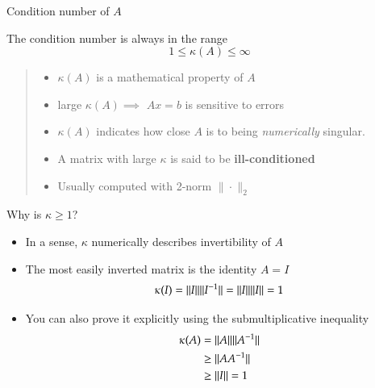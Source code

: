 \documentclass[10pt]{beamer}
\begin{document}
\begin{frame}{Condition number of $A$}

The condition number is always in the range
\begin{equation*}
    1 \le \kappa(A) \le \infty
\end{equation*}
\begin{quote}
\begin{itemize}
    \item   $\kappa(A)$ is a mathematical property of $A$
    \item   large $\kappa(A) \implies$ $Ax=b$ is sensitive to errors 
    \item   $\kappa(A)$ indicates how close
            $A$ is to being \emph{numerically} singular.
    \item   A matrix with large $\kappa$ is said to be \textbf{ill-conditioned}
    \item Usually computed with 2-norm $\|\cdot\|_2$
\end{itemize}
\end{quote}
\end{frame}
\begin{frame}{Why is $\kappa\ge 1$?}
\begin{itemize}
    \item In a sense, $\kappa$ numerically describes invertibility of $A$ 
    \item The most easily inverted matrix is the identity $A = I$
    $$
        \kappa(I) = {{\|I\|}}{{\|I^{-1}\|}} ={{\|I\|}}{{\|I\|}} =  1
    $$
    \item You can also prove it explicitly using the submultiplicative inequality 
    \begin{align*}
        \kappa(A) &=  {{\|A\|}}{{\|A^{-1}\|}}\\
                  &\ge  {\ensuremath{{\|AA^{-1}\|}}}\\
                  &\ge  {\ensuremath{{\|I\|}}}=  1 \\
    \end{align*}
\end{itemize}
\end{frame}
\end{document}
